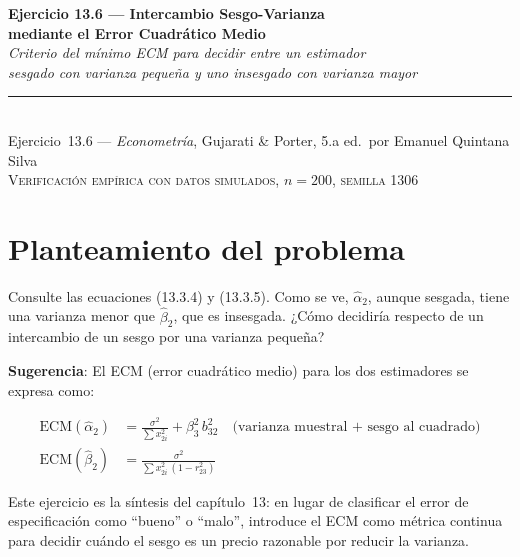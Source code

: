 \documentclass[12pt, letterpaper]{article}
\begin{document}

\begin{center}
  {\LARGE\bfseries Ejercicio 13.6 --- Intercambio Sesgo-Varianza}\\[4pt]
  {\LARGE\bfseries mediante el Error Cuadrático Medio}\\[12pt]
  {\large\itshape Criterio del mínimo ECM para decidir entre un estimador}\\
  {\large\itshape sesgado con varianza pequeña y uno insesgado con varianza mayor}\\[14pt]
  \rule{0.55\linewidth}{0.6pt}\\[8pt]
  {\normalsize Ejercicio~13.6 --- \textit{Econometría}, Gujarati \& Porter, 5.a ed.\
  por Emanuel Quintana Silva}\\[4pt]
  {\small\textsc{Verificación empírica con datos simulados, $n = 200$, semilla 1306}}
\end{center}

\vspace{10pt}

\section{Planteamiento del problema}

Consulte las ecuaciones (13.3.4) y (13.3.5). Como se ve, $\hat{\alpha}_2$,
aunque sesgada, tiene una varianza menor que $\hat{\beta}_2$, que es
insesgada. ¿Cómo decidiría respecto de un intercambio de un sesgo por una
varianza pequeña?

\textbf{Sugerencia}: El ECM (error cuadrático medio) para los dos estimadores
se expresa como:

\begin{align}
  \mathrm{ECM}(\hat{\alpha}_2)
    &= \frac{\sigma^2}{\sum x_{2i}^2} + \beta_3^2\,b_{32}^2
    \quad \text{(varianza muestral + sesgo al cuadrado)} \label{eq:ecm_a}\\[6pt]
  \mathrm{ECM}(\hat{\beta}_2)
    &= \frac{\sigma^2}{\sum x_{2i}^2\,(1 - r_{23}^2)} \label{eq:ecm_b}
\end{align}

Este ejercicio es la síntesis del capítulo~13: en lugar de clasificar el error
de especificación como ``bueno'' o ``malo'', introduce el ECM como métrica
continua para decidir cuándo el sesgo es un precio razonable por reducir la
varianza.
\end{document}

